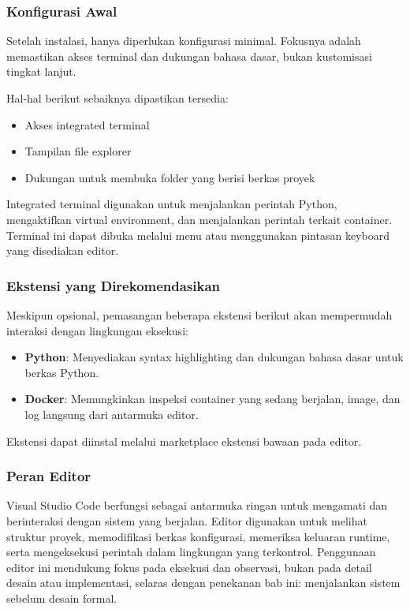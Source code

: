\subsubsection{Konfigurasi Awal}

Setelah instalasi, hanya diperlukan konfigurasi minimal. Fokusnya adalah
memastikan akses terminal dan dukungan bahasa dasar, bukan kustomisasi tingkat
lanjut.

Hal-hal berikut sebaiknya dipastikan tersedia:

\begin{itemize}
  \item Akses integrated terminal
  \item Tampilan file explorer
  \item Dukungan untuk membuka folder yang berisi berkas proyek
\end{itemize}

Integrated terminal digunakan untuk menjalankan perintah Python, mengaktifkan
virtual environment, dan menjalankan perintah terkait container. Terminal ini
dapat dibuka melalui menu atau menggunakan pintasan keyboard yang disediakan
editor.

\subsubsection{Ekstensi yang Direkomendasikan}

Meskipun opsional, pemasangan beberapa ekstensi berikut akan mempermudah
interaksi dengan lingkungan eksekusi:

\begin{itemize}
  \item \textbf{Python}: Menyediakan syntax highlighting dan dukungan bahasa dasar
        untuk berkas Python.
  \item \textbf{Docker}: Memungkinkan inspeksi container yang sedang berjalan,
        image, dan log langsung dari antarmuka editor.
\end{itemize}

Ekstensi dapat diinstal melalui marketplace ekstensi bawaan pada editor.

\subsubsection{Peran Editor}

Visual Studio Code berfungsi sebagai antarmuka ringan untuk mengamati dan
berinteraksi dengan sistem yang berjalan. Editor digunakan untuk melihat struktur
proyek, memodifikasi berkas konfigurasi, memeriksa keluaran runtime, serta
mengeksekusi perintah dalam lingkungan yang terkontrol. Penggunaan editor ini
mendukung fokus pada eksekusi dan observasi, bukan pada detail desain atau
implementasi, selaras dengan penekanan bab ini: menjalankan sistem sebelum desain
formal.


